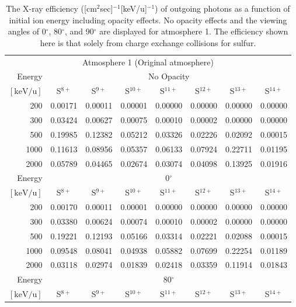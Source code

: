 \begin{table}[ht]
    \centering
    \caption{The X-ray efficiency ([cm$^2$sec]$^{-1}$[keV/u]$^{-1}$) of outgoing photons as a function of initial ion energy including opacity effects. No opacity effects and the viewing angles of 0$^\circ$, 80$^\circ$, and 90$^\circ$ are displayed for atmosphere 1. The efficiency shown here is that solely from charge exchange collisions for sulfur.}
    \begin{tabular}{r|c|c|c|c|c|c|c}
    \multicolumn{8}{c}{Atmosphere 1 (Original atmosphere)} \\ \cline{2-8}
    Energy & \multicolumn{7}{c}{No Opacity} \\ \cline{2-8}
    $\mathrm{[keV/u]}$ & S$^{8+}$ & S$^{9+}$ & S$^{10+}$ & S$^{11+}$ & S$^{12+}$ & S$^{13+}$ & S$^{14+}$ \\ \cline{1-8}
    200   & 0.00171 & 0.00011 & 0.00001 & 0.00000 & 0.00000 & 0.00000 & 0.00000 \\
    300   & 0.03424 & 0.00627 & 0.00075 & 0.00010 & 0.00002 & 0.00000 & 0.00000 \\
    500   & 0.19985 & 0.12382 & 0.05212 & 0.03326 & 0.02226 & 0.02092 & 0.00015 \\
    1000  & 0.11613 & 0.08956 & 0.05357 & 0.06133 & 0.07924 & 0.22711 & 0.01195 \\
    2000  & 0.05789 & 0.04465 & 0.02674 & 0.03074 & 0.04098 & 0.13925 & 0.01916 \\ \cline{1-8}
    Energy & \multicolumn{7}{c}{0$^\circ$} \\ \cline{2-8}
    $\mathrm{[keV/u]}$ & S$^{8+}$ & S$^{9+}$ & S$^{10+}$ & S$^{11+}$ & S$^{12+}$ & S$^{13+}$ & S$^{14+}$ \\ \cline{1-8}
    200   & 0.00170 & 0.00011 & 0.00001 & 0.00000 & 0.00000 & 0.00000 & 0.00000 \\
    300   & 0.03380 & 0.00624 & 0.00074 & 0.00010 & 0.00002 & 0.00000 & 0.00000 \\
    500   & 0.19221 & 0.12193 & 0.05166 & 0.03314 & 0.02221 & 0.02088 & 0.00015 \\
    1000  & 0.09548 & 0.08041 & 0.04938 & 0.05882 & 0.07699 & 0.22254 & 0.01189 \\
    2000  & 0.03118 & 0.02974 & 0.01839 & 0.02418 & 0.03359 & 0.11914 & 0.01843 \\ \cline{1-8}
    Energy & \multicolumn{7}{c}{80$^\circ$} \\ \cline{2-8}
    $\mathrm{[keV/u]}$ & S$^{8+}$ & S$^{9+}$ & S$^{10+}$ & S$^{11+}$ & S$^{12+}$ & S$^{13+}$ & S$^{14+}$ \\ \cline{1-8}

\end{tabular}
\end{table}

